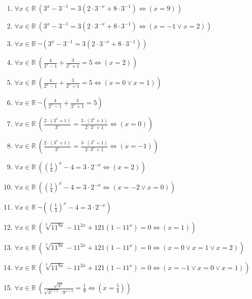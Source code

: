 \documentclass[11pt,a4paper]{article}
\begin{document}
\begin{enumerate}
\item $\displaystyle \forall x \in \mathbb{R}\ \left( 3^{x} - 3^{-1} = 3(2 \cdot 3^{-x} + 8 \cdot 3^{-1}) \iff \left( x = 9 \right) \right)$
\item $\displaystyle \forall x \in \mathbb{R}\ \left( 3^{x} - 3^{-1} = 3(2 \cdot 3^{-x} + 8 \cdot 3^{-1}) \iff \left( x = -1 \lor x = 2 \right) \right)$
\item $\displaystyle \forall x \in \mathbb{R}\ \lnot \left( 3^{x} - 3^{-1} = 3(2 \cdot 3^{-x} + 8 \cdot 3^{-1}) \right)$
\item $\displaystyle \forall x \in \mathbb{R}\ \left( \frac{4}{2^{x} - 1} + \frac{3}{2^{x} + 1} = 5 \iff \left( x = 2 \right) \right)$
\item $\displaystyle \forall x \in \mathbb{R}\ \left( \frac{4}{2^{x} - 1} + \frac{3}{2^{x} + 1} = 5 \iff \left( x = 0 \lor x = 1 \right) \right)$
\item $\displaystyle \forall x \in \mathbb{R}\ \lnot \left( \frac{4}{2^{x} - 1} + \frac{3}{2^{x} + 1} = 5 \right)$
\item $\displaystyle \forall x \in \mathbb{R}\ \left( \frac{2 \cdot (3^{x} + 1)}{3^{x}} = \frac{3 \cdot (3^{x} + 1)}{2 \cdot 3^{x} + 1} \iff \left( x = 0 \right) \right)$
\item $\displaystyle \forall x \in \mathbb{R}\ \left( \frac{2 \cdot (3^{x} + 1)}{3^{x}} = \frac{3 \cdot (3^{x} + 1)}{2 \cdot 3^{x} + 1} \iff \left( x = -1 \right) \right)$
\item $\displaystyle \forall x \in \mathbb{R}\ \left( \left(\frac{1}{4}\right)^{x} - 4 = 3 \cdot 2^{-x} \iff \left( x = 2 \right) \right)$
\item $\displaystyle \forall x \in \mathbb{R}\ \left( \left(\frac{1}{4}\right)^{x} - 4 = 3 \cdot 2^{-x} \iff \left( x = -2 \lor x = 0 \right) \right)$
\item $\displaystyle \forall x \in \mathbb{R}\ \lnot \left( \left(\frac{1}{4}\right)^{x} - 4 = 3 \cdot 2^{-x} \right)$
\item $\displaystyle \forall x \in \mathbb{R}\ \left( \sqrt[3]{11^{9x}} - 11^{2x} + 121(1 - 11^{x}) = 0 \iff \left( x = 1 \right) \right)$
\item $\displaystyle \forall x \in \mathbb{R}\ \left( \sqrt[3]{11^{9x}} - 11^{2x} + 121(1 - 11^{x}) = 0 \iff \left( x = 0 \lor x = 1 \lor x = 2 \right) \right)$
\item $\displaystyle \forall x \in \mathbb{R}\ \left( \sqrt[3]{11^{9x}} - 11^{2x} + 121(1 - 11^{x}) = 0 \iff \left( x = -1 \lor x = 0 \lor x = 1 \right) \right)$
\item $\displaystyle \forall x \in \mathbb{R}\ \left( \frac{\sqrt{3^{x}}}{\sqrt{3^{x+1}} \cdot 9^{x+2}} = \frac{1}{9} \iff \left( x = \frac{5}{4} \right) \right)$

\end{enumerate}
\end{document}
